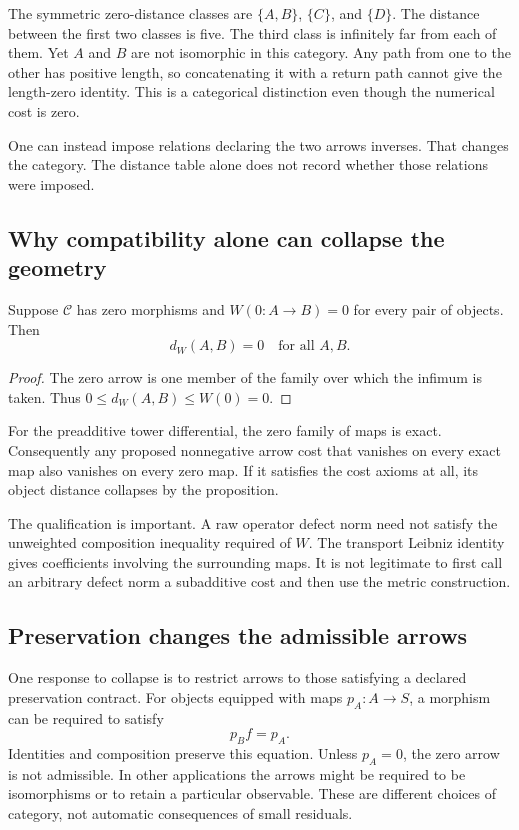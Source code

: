 
The symmetric zero-distance classes are \(\{A,B\}\), \(\{C\}\), and \(\{D\}\). The distance between the first two classes is five. The third class is infinitely far from each of them. Yet \(A\) and \(B\) are not isomorphic in this category. Any path from one to the other has positive length, so concatenating it with a return path cannot give the length-zero identity. This is a categorical distinction even though the numerical cost is zero.

One can instead impose relations declaring the two arrows inverses. That changes the category. The distance table alone does not record whether those relations were imposed.

\subsection{Why compatibility alone can collapse the geometry}
\begin{proposition}\label{KS79}
Suppose \(\mathcal C\) has zero morphisms and \(W(0:A\to B)=0\) for every pair of objects. Then
\[
 d_W(A,B)=0\quad\text{for all }A,B.
\]
\end{proposition}
\begin{proof}
The zero arrow is one member of the family over which the infimum is taken. Thus \(0\le d_W(A,B)\le W(0)=0\).
\end{proof}
For the preadditive tower differential, the zero family of maps is exact. Consequently any proposed nonnegative arrow cost that vanishes on every exact map also vanishes on every zero map. If it satisfies the cost axioms at all, its object distance collapses by the proposition.

The qualification is important. A raw operator defect norm need not satisfy the unweighted composition inequality required of \(W\). The transport Leibniz identity gives coefficients involving the surrounding maps. It is not legitimate to first call an arbitrary defect norm a subadditive cost and then use the metric construction.

\subsection{Preservation changes the admissible arrows}
One response to collapse is to restrict arrows to those satisfying a declared preservation contract. For objects equipped with maps \(p_A:A\to S\), a morphism can be required to satisfy
\[
 p_Bf=p_A.
\]
Identities and composition preserve this equation. Unless \(p_A=0\), the zero arrow is not admissible. In other applications the arrows might be required to be isomorphisms or to retain a particular observable. These are different choices of category, not automatic consequences of small residuals.

